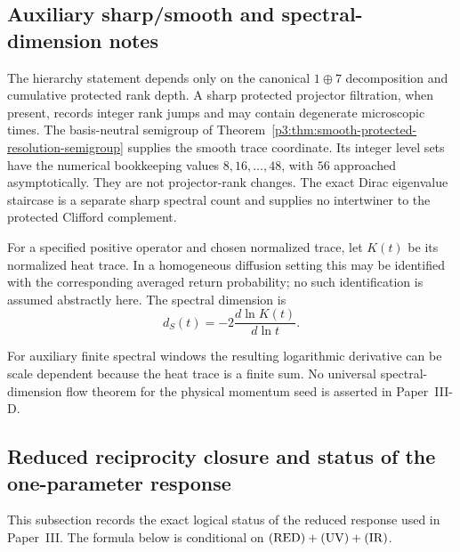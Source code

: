 \documentclass[11pt,a4paper]{article}
\begin{document}
\subsection{Auxiliary sharp/smooth and spectral-dimension notes}
\label{p3d:app:auxiliary-flow-diagnostics}
\begin{remark}
The hierarchy statement depends only on the canonical \(1\oplus7\) decomposition
and cumulative protected rank depth.  A sharp protected projector filtration,
when present, records integer rank jumps and may contain degenerate microscopic
times.  The basis-neutral semigroup of
Theorem~\ref{p3:thm:smooth-protected-resolution-semigroup} supplies the smooth
trace coordinate.  Its integer level sets have the numerical bookkeeping
values \(8,16,\ldots,48\), with \(56\) approached asymptotically.  They are
not projector-rank changes.  The exact Dirac eigenvalue staircase is a
separate sharp spectral count and supplies no intertwiner to the protected
Clifford complement.
\end{remark}

\begin{definition}
For a specified positive operator and chosen normalized trace, let
\(K(t)\) be its normalized heat trace.  In a homogeneous diffusion setting
this may be identified with the corresponding averaged return probability; no
such identification is assumed abstractly here.  The spectral dimension is
\begin{equation}
d_S(t) = -2\frac{d \ln K(t)}{d \ln t}.
\end{equation}
\end{definition}

For auxiliary finite spectral windows the resulting logarithmic derivative
can be scale dependent because the heat trace is a finite sum.  No universal
spectral-dimension flow theorem for the physical momentum seed is asserted in
Paper~III-D.
\subsection{Reduced reciprocity closure and status of the one-parameter response}
\label{p3:app:center}

This subsection records the exact logical status of the reduced response used in
Paper~III.  The formula below is conditional on
\(({\rm RED})+({\rm UV})+({\rm IR})\).
\end{document}
